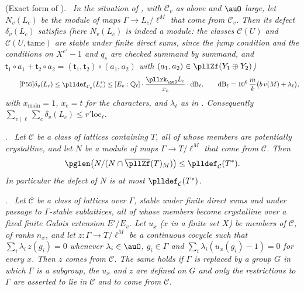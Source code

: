 \documentclass[10pt]{amsart}
\theoremstyle{definition}
\theoremstyle{remark}
\newcommand{\Q}{\mathbb Q}
\providecommand{\pgloc}{\mathrm{loc}}
\providecommand{\pgv}{v}
\providecommand{\pllD}{\mathrm{dB}}
\newenvironment{quotedthm}[2]{\par\medskip\noindent\begingroup
  \textbf{#1}#2.\ \itshape\ignorespaces}{\endgroup\par\medskip}
\begin{document}
\begin{quotedthm}{\cite[Proposition~5.2]{P55}}{ (Exact form of {\cite[Proposition~2.28]{P55}})}
In the situation of {\cite[Proposition~2.28]{P55}}, with $\mathcal C_v$ as above and $\auO$ large, let
$N_v(L_c)$ be the module of maps $\Gamma\to L_c/\ell^M$ that come from $\mathcal C_v$. Then its
defect $\delta_v(L_c)$ satisfies (here $N_v(L_c)$ is indeed a module: the classes
$\mathcal C(U)$ and $\mathcal C(U,\mathrm{tame})$ are stable under finite direct sums, since the
jump condition and the conditions on $X^{e'}-1$ and $q_s$ are checked summand by summand, and
$\mathsf t_1\circ a_1+\mathsf t_2\circ a_2=(\mathsf t_1,\mathsf t_2)\circ(a_1,a_2)$ with
$(a_1,a_2)\in\pllZf(Y_1\oplus Y_2)$)
\begin{equation*}\tag*{{\cite[(9)]{P55}}}
\delta_v(L_c)\le\plldef_{\mathcal C_v}(L_c^*)\le[E_v:\Q_\ell]\cdot\frac{\pllrk_\auO L_c}{x_c}
\cdot\pllD_\ell,\qquad
\pllD_\ell=10^6\,\frac mk\bigl(b\,\pgv(M)+\lambda_\ell\bigr),
\end{equation*}
with $x_{\mathrm{main}}=1$, $x_e=t$ for the characters, and $\lambda_\ell$ as in
{\cite[\S2.1]{P55}}. Consequently $\sum_{v\mid\ell}\sum_c\delta_v(L_c)\le r'\pgloc_\ell$.
\end{quotedthm}

\begin{quotedthm}{\cite[Proposition~5.4]{P55}}{}
Let $\mathcal C$ be a class of lattices containing $T$, all of whose members are potentially
crystalline, and let $N$ be a module of maps $\Gamma\to T/\ell^M$ that come from $\mathcal C$. Then
\[
\pglen\bigl(N/(N\cap\overline{\pllZf}(T)_M)\bigr)\le\plldef_{\mathcal C}(T^*).
\]
In particular the defect of $N$ is at most $\plldef_{\mathcal C}(T^*)$.
\end{quotedthm}

\begin{quotedthm}{\cite[Lemma~5.5]{P55}}{}
Let $\mathcal C$ be a class of lattices over $\Gamma$, stable under finite direct sums and under
passage to $\Gamma$-stable sublattices, all of whose members become crystalline over a fixed finite
Galois extension $E'/E_v$. Let $u_x$ ($x$ in a finite set $X$) be members of $\mathcal C$, of ranks
$n_x$, and let $z\colon\Gamma\to T/\ell^M$ be a continuous cocycle such that $\sum_i\lambda_i\,
z(g_i)=0$ whenever $\lambda_i\in\auO$, $g_i\in\Gamma$ and $\sum_i\lambda_i(u_x(g_i)-1)=0$ for every
$x$. Then $z$ comes from $\mathcal C$. The same holds if $\Gamma$ is replaced by a group $G$ in which
$\Gamma$ is a subgroup, the $u_x$ and $z$ are defined on $G$ and only the restrictions to $\Gamma$
are asserted to lie in $\mathcal C$ and to come from $\mathcal C$.
\end{quotedthm}
\end{document}
